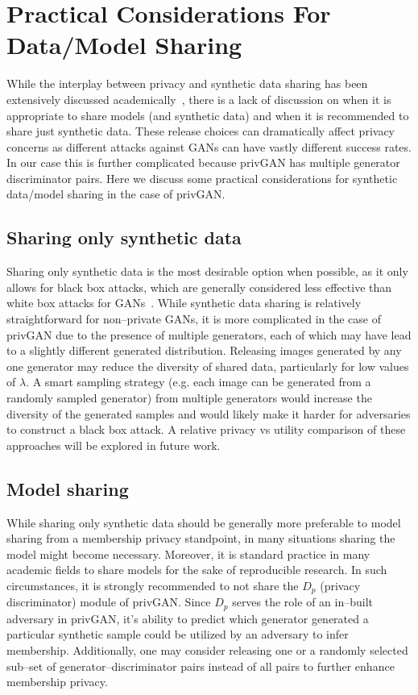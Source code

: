 \documentclass{article}
\begin{document}
\section{Practical Considerations For Data/Model Sharing}
 While the interplay between privacy and synthetic data sharing has been extensively discussed academically~\cite{bellovin2019privacy}, there is a lack of discussion on when it is appropriate to share models (and synthetic data) and when it is recommended to share just synthetic data. These release choices can dramatically affect privacy concerns as different attacks against GANs can have vastly different success rates. In our case this is further complicated because privGAN has multiple generator discriminator pairs. Here we discuss some practical considerations for synthetic data/model sharing in the case of privGAN. 

\subsection{Sharing only synthetic data}
Sharing only synthetic data is the most desirable option when possible, as it only allows for black box attacks, which are generally considered less effective than white box attacks for GANs~\cite{hayes2019logan}. While synthetic data sharing is relatively straightforward for non--private GANs, it is more complicated in the case of privGAN due to the presence of multiple generators, each of which may have lead to a slightly different generated distribution. Releasing images generated by any one generator may reduce the diversity of shared data, particularly for low values of $\lambda$. A smart sampling strategy (e.g. each image can be generated from a randomly sampled generator) from multiple generators would increase the diversity of the generated samples and would likely make it harder for adversaries to construct a black box attack. A relative privacy vs utility comparison of these approaches will be explored in future work. 

\subsection{Model sharing}
While sharing only synthetic data should be generally more preferable to model sharing from a membership privacy standpoint, in many situations sharing the model might become necessary. Moreover, it is standard practice in many academic fields to share models for the sake of reproducible research. In such circumstances, it is strongly recommended to not share the $D_p$ (privacy discriminator) module of privGAN. Since $D_p$ serves the role of an in--built adversary in privGAN, it's ability to predict which generator generated a particular synthetic sample could be utilized by an adversary to infer membership. Additionally, one may consider releasing one or a randomly selected sub--set of generator--discriminator pairs instead of all pairs to further enhance membership privacy. 
\end{document}

